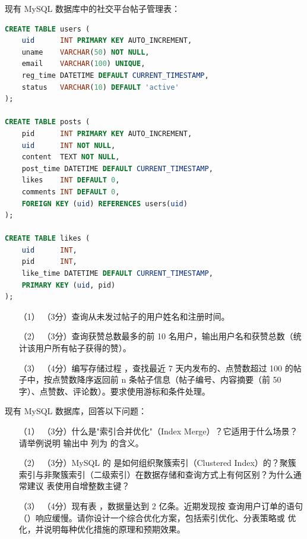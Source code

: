 \documentclass[a4paper,11pt]{article}
\begin{document}
\anslines{4.5cm}


\q 现有 MySQL 数据库中的社交平台帖子管理表：
\begin{lstlisting}[language=SQL]
CREATE TABLE users (
    uid      INT PRIMARY KEY AUTO_INCREMENT,
    uname    VARCHAR(50) NOT NULL,
    email    VARCHAR(100) UNIQUE,
    reg_time DATETIME DEFAULT CURRENT_TIMESTAMP,
    status   VARCHAR(10) DEFAULT 'active'
);

CREATE TABLE posts (
    pid      INT PRIMARY KEY AUTO_INCREMENT,
    uid      INT NOT NULL,
    content  TEXT NOT NULL,
    post_time DATETIME DEFAULT CURRENT_TIMESTAMP,
    likes    INT DEFAULT 0,
    comments INT DEFAULT 0,
    FOREIGN KEY (uid) REFERENCES users(uid)
);

CREATE TABLE likes (
    uid      INT,
    pid      INT,
    like_time DATETIME DEFAULT CURRENT_TIMESTAMP,
    PRIMARY KEY (uid, pid)
);
\end{lstlisting}
\begin{enumerate}[leftmargin=2em, itemsep=3pt]
  \item[（1）] （3分）查询从未发过帖子的用户姓名和注册时间。
  \item[（2）] （3分）查询获赞总数最多的前 10 名用户，输出用户名和获赞总数（统计该用户所有帖子获得的赞）。
  \item[（3）] （4分）编写存储过程 ，查找最近 7 天内发布的、点赞数超过 100 的帖子中，按点赞数降序返回前 n 条帖子信息（帖子编号、内容摘要（前 50 字）、点赞数、评论数）。要求使用游标和条件处理。
\end{enumerate}
\anslines{3.5cm}

\q 现有 MySQL 数据库，回答以下问题：
\begin{enumerate}[leftmargin=2em, itemsep=3pt]
  \item[（1）] （3分）什么是"索引合并优化"（Index Merge）？它适用于什么场景？请举例说明  输出中  列为  的含义。
  \item[（2）] （3分）MySQL 的  是如何组织聚簇索引（Clustered Index）的？聚簇索引与非聚簇索引（二级索引）在数据存储和查询方式上有何区别？为什么通常建议  表使用自增整数主键？
  \item[（3）] （4分）现有表 ，数据量达到 2 亿条。近期发现按  查询用户订单的语句（）响应缓慢。请你设计一个综合优化方案，包括索引优化、分表策略或  优化，并说明每种优化措施的原理和预期效果。
\end{enumerate}
\anslines{3.5cm}
\end{document}
